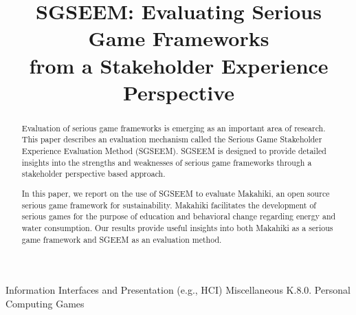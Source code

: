 \documentclass{sigchi}
\begin{document}
\title{SGSEEM: Evaluating Serious Game Frameworks\\ from a Stakeholder Experience Perspective}


\maketitle

\begin{abstract}
  Evaluation of serious game frameworks is emerging as an important area of research. 
  This paper describes an evaluation mechanism called the
  Serious Game Stakeholder Experience Evaluation Method (SGSEEM). SGSEEM is designed to
  provide detailed insights into the strengths and weaknesses of serious game frameworks
  through a stakeholder perspective based approach.

  In this paper, we report on the use of SGSEEM to evaluate
  Makahiki, an open source serious game framework for sustainability.  Makahiki 
  facilitates the development of serious games for the purpose of education and
  behavioral change regarding energy and water consumption. Our results provide useful
  insights into both Makahiki as a serious game framework and SGEEM as an evaluation method.
\end{abstract}


 {Information Interfaces and Presentation (e.g., HCI)} {Miscellaneous} {K.8.0.} {Personal Computing} {Games}

\end{document}
